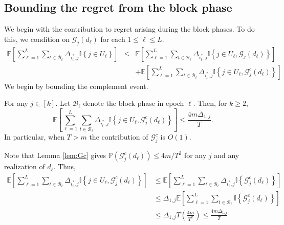 \documentclass[opre,blindrev]{informs3}
\newcommand{\ind}[1]{\mathbb{I}\left\{#1\right\}}
\newcommand{\bE}[1]{{\mathbb{E}\left[#1\right]}}
\newcommand{\bP}[1]{{\mathbb{P}\left(#1\right)}}
\begin{document}
\begin{APPENDICES}
\subsection{Bounding the regret from the block phase}
We begin with the contribution to regret arising during the block phases. To do this, we condition on \(\mathcal{G}_j(d_\ell)\) for each \(1\leq \ell \leq L\).
\begin{eqnarray*}
   \bE{\sum_{\ell =1}^L \sum_{t\in \mathcal{B}_\ell}\Delta_{i^*_t, j} \ind{j\in U_{\ell}}}
    &\leq& \bE{\sum_{\ell =1}^L \sum_{t\in \mathcal{B}_\ell}\Delta_{i^*_t, j} \ind{j\in U_{\ell},\mathcal{G}_j(d_\ell)}} \\
    &&+ \bE{\sum_{\ell =1}^L \sum_{t\in \mathcal{B}_\ell}\Delta_{i^*_t, j} \ind{j\in U_{\ell},\mathcal{G}^c_j(d_\ell)}}
\end{eqnarray*}
We begin by bounding the complement event.


\begin{lemma}\label{lem:block-complement-regret}
For any \(j\in[k]\). Let \(\mathcal{B}_\ell\) denote the block phase in epoch \(\ell\). Then, for \(k\ge 2\),
\[
    \bE{\sum_{\ell =1}^L \sum_{t\in \mathcal{B}_\ell}\Delta_{i^*_t, j} \ind{j\in U_{\ell},\mathcal{G}^c_j(d_\ell)}} 
    \le
    \frac{4m\Delta_{1,j}}{T}.
\]
In particular, when \(T>m\) the contribution of \(\mathcal{G}_j^c\) is
\(O\!\left(1\right)\).
\end{lemma}
    Note that Lemma \ref{lem:Gc} gives \(\bP{\mathcal{G}_j^c(d_{\ell})}\leq 4m/T^2\) for any \(j\) and any realization of \(d_\ell\). Thus,
    \begin{align*}
        \bE{\sum_{\ell =1}^L \sum_{t\in \mathcal{B}_\ell}\Delta_{i^*_t, j} \ind{j\in U_{\ell},\mathcal{G}^c_j(d_\ell)}} 
        &\leq \bE{\sum_{\ell =1}^L \sum_{t\in \mathcal{B}_\ell}\Delta_{i^*_t, j} \ind{\mathcal{G}^c_j(d_\ell)}} \\
        &\leq \Delta_{1,j}\bE{\sum_{\ell =1}^L \sum_{t\in \mathcal{B}_\ell} \ind{\mathcal{G}^c_j(d_\ell)}} \\
        &\leq  \Delta_{1,j}T\left(\frac{4m}{T^2}\right) \leq \frac{4m\Delta_{1,j}}{T} 
    \end{align*}
\Halmos


\end{APPENDICES}
\end{document}
